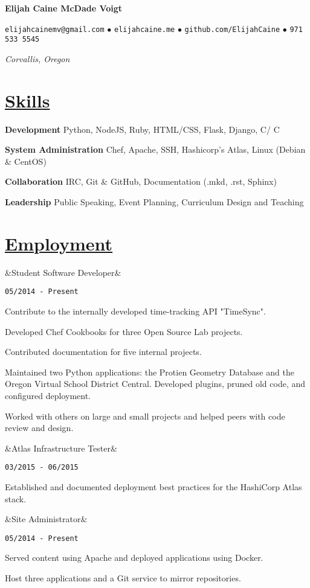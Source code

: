 \documentclass[11pt]{article}
\newcommand{\heading}[1]{
    \section*{\uline{\hfill #1}}
}
\newcommand{\squish}{
    \setlength{\itemsep}{0.5pt}
    \setlength{\parskip}{2.5pt}
    \setlength{\parsep}{0.5pt}
}
\newcommand{\when}[1]{
    \hfill \texttt{#1}
}
\newcommand{\experience}[3]{
    \ifx&#2&
        \item[{#1}]
    \else
        \item[{#1}, \emph{#2}]
    \fi
    \when{#3}
}
\newcommand{\contact}[5]{
    \centerline{
        \large       
        \texttt{#1}
        $\bullet$
        \texttt{#2}
        $\bullet$
        \texttt{#3}
        $\bullet$
        \texttt{#4}
    }
    \centerline{
        \emph{#5}
    }
}
\newcommand{\skill}[2]{
    \textbf{#1} \hfill #2
}
\newcommand{\CPP}{
    C\hspace{-.05em}\raisebox{.4ex}{\tiny\bf +}\hspace{-.10em}\raisebox{.4ex}{\tiny\bf +}
}
\begin{document}
\centerline{{\Huge \bf Elijah Caine McDade Voigt}}
\bigskip

\contact{elijahcainemv@gmail.com}
        {elijahcaine.me}
        {github.com/ElijahCaine}
        {971 533 5545}
        {Corvallis, Oregon}

\heading{Skills}%

\skill{Development}{Python, NodeJS, Ruby, HTML/CSS, Flask, Django, C/\CPP}

\skill{System Administration}{Chef, Apache, SSH, Hashicorp's Atlas, Linux (Debian \& CentOS)}

\skill{Collaboration}{IRC, Git \& GitHub, Documentation (.mkd, .rst, Sphinx)} 

\skill{Leadership}{Public Speaking, Event Planning, Curriculum Design and
Teaching}



\heading{Employment}%

\begin{description}
\squish

\experience{OSU Open Source Lab}
           {Student Software Developer}
           {05/2014 - Present}

    Contribute to the internally developed time-tracking API "TimeSync".

    Developed Chef Cookbooks for three Open Source Lab projects.

    Contributed documentation for five internal projects.

    Maintained two Python applications: the Protien Geometry Database and the
    Oregon Virtual School District Central. Developed plugins, pruned old code,
    and configured deployment.

    Worked with others on large and small projects and helped peers with code
    review and design.

\experience{Hashi Scholars Participant}
           {Atlas Infrastructure Tester}
           {03/2015 - 06/2015}

    Established and documented deployment best practices for the HashiCorp
    Atlas stack.

\experience{elijahcaine.me}
           {Site Administrator}
           {05/2014 - Present}

    Served content using Apache and deployed applications using Docker.

    Host three applications and a Git service to mirror repositories.


\end{description}
\end{document}
